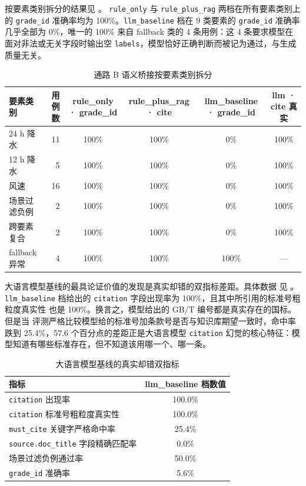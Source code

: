 按要素类别拆分的结果见 。
\texttt{rule\_\bk{}only} 与 \texttt{rule\_\bk{}plus\_\bk{}rag} 两档在所有要素类别上的
\texttt{grade\_\bk{}id} 准确率均为 100\%。\texttt{llm\_\bk{}baseline} 档在
9 类要素的 \texttt{grade\_\bk{}id} 准确率几乎全部为 0\%，唯一的 100\% 来自
fallback 类的 4 条用例：这 4 条要求模型在面对非法或无关字段时输出空
\texttt{labels}，模型恰好正确判断而被记为通过，与生成质量无关。

\begin{table}[H]
    \centering
    \caption{通路 B 语义桥接按要素类别拆分}
    \label{tab:bridge-by-category}
    \song\fontsize{9pt}{12pt}\selectfont
    \renewcommand{\arraystretch}{0.95}
    \begin{tabular}{lrcccc}
        \toprule
        要素类别 & 用例数 & rule\_only · grade\_id & rule\_plus\_rag · cite & llm\_baseline · grade\_id & llm · cite 真实 \\
        \midrule
        24 h 降水 & 11 & 100\% & 100\% & 0\% & 100\% \\
        12 h 降水 & 5 & 100\% & 100\% & 0\% & 100\% \\
        风速 & 16 & 100\% & 100\% & 0\% & 100\% \\
        场景过滤负例 & 2 & 100\% & 100\% & 0\% & 100\% \\
        跨要素复合 & 2 & 100\% & 100\% & 0\% & 100\% \\
        fallback 异常 & 4 & 100\% & 100\% & 100\% & --- \\
        \bottomrule
    \end{tabular}
\end{table}

大语言模型基线的最具论证价值的发现是真实却错的双指标差距。具体数据
见 。\texttt{llm\_\bk{}baseline} 档给出的
\texttt{citation} 字段出现率为 100\%，且其中所引用的标准号粗粒度真实性
也是 100\%。换言之，模型给出的 GB/T 编号都是真实存在的国标。但是当
评测严格比较模型给的标准号加条款号是否与知识库期望一致时，命中率
跌到 25.4\%，57.6 个百分点的差距正是大语言模型 \texttt{citation}
幻觉的核心特征：模型知道有哪些标准存在，但不知道该用哪一个、哪一条。

\begin{table}[H]
    \centering
    \caption{大语言模型基线的真实却错双指标}
    \label{tab:bridge-llm-trap}
    \song\wuhao
    \begin{tabular}{lc}
        \toprule
        指标 & llm\_baseline 档数值 \\
        \midrule
        \texttt{citation} 出现率 & 100.0\% \\
        \texttt{citation} 标准号粗粒度真实性 & 100.0\% \\
        \texttt{must\_\bk{}cite} 关键字严格命中率 & 25.4\% \\
        \texttt{source.\bk{}doc\_\bk{}title} 字段精确匹配率 & 0.0\% \\
        场景过滤负例通过率 & 50.0\% \\
        \texttt{grade\_\bk{}id} 准确率 & 5.6\% \\
        \bottomrule
    \end{tabular}
\end{table}

